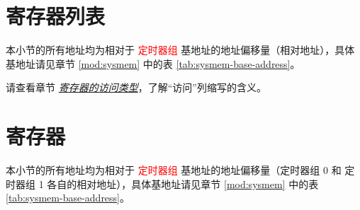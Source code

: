 \documentclass[main\_\_CN.tex]{subfiles}
\begin{document}


\clearpage
\section{寄存器列表}
\label{sec:timg-reg-summ}
\hypertarget{timg-reg-summ}{}

本小节的所有地址均为相对于 \textcolor{red}{定时器组} 基地址的地址偏移量（相对地址），具体基地址请见章节 \ref{mod:sysmem} \textit{} 中的表 \ref{tab:sysmem-base-address}。

请查看章节 \hyperref[glossary-access-types]{\textit{寄存器的访问类型}}，了解“访问”列缩写的含义。






\clearpage
\section{寄存器}

本小节的所有地址均为相对于 \textcolor{red}{定时器组} 基地址的地址偏移量（定时器组 0 和 定时器组 1 各自的相对地址），具体基地址请见章节 \ref{mod:sysmem} \textit{} 中的表 \ref{tab:sysmem-base-address}。


\end{document}
